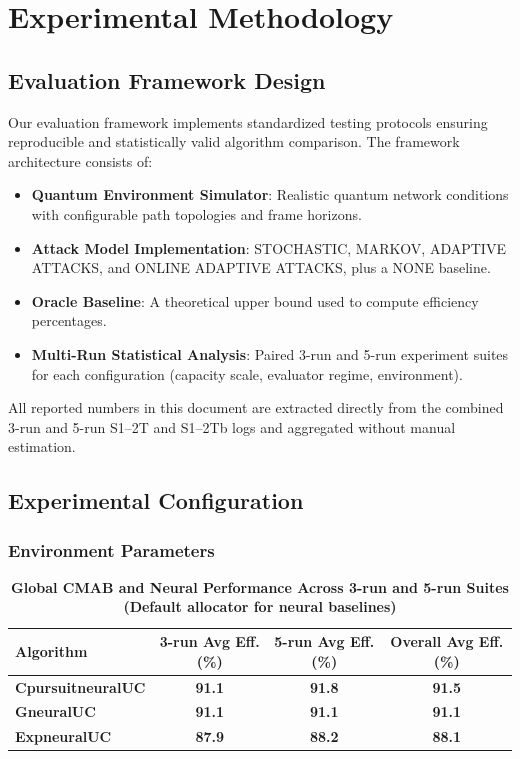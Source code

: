 \documentclass[12pt,a4paper]{article}
\newcommand{\performance}[1]{\textcolor{performancecolor}{\textbf{#1}}}
\newcommand{\neural}[1]{\textcolor{neuralcolor}{\textbf{#1}}}
\begin{document}
\newpage
\section{Experimental Methodology}

\subsection{Evaluation Framework Design}

Our evaluation framework implements standardized testing protocols ensuring reproducible and statistically valid algorithm comparison. The framework architecture consists of:

\begin{itemize}
\item \textbf{Quantum Environment Simulator}: Realistic quantum network conditions with configurable path topologies and frame horizons.
\item \textbf{Attack Model Implementation}: STOCHASTIC, MARKOV, ADAPTIVE ATTACKS, and ONLINE ADAPTIVE ATTACKS, plus a NONE baseline.
\item \textbf{Oracle Baseline}: A theoretical upper bound used to compute efficiency percentages.
\item \textbf{Multi-Run Statistical Analysis}: Paired 3-run and 5-run experiment suites for each configuration (capacity scale, evaluator regime, environment).
\end{itemize}

All reported numbers in this document are extracted directly from the combined 3-run and 5-run S1–2T and S1–2Tb logs and aggregated without manual estimation.

\subsection{Experimental Configuration}

\subsubsection{Environment Parameters}

\begin{table}[H]
\small
\centering
\caption{\performance{Global CMAB and Neural Performance Across 3-run and 5-run Suites (Default allocator for neural baselines)}}
\label{tab:global-performance}
\begin{tabular}{|l|c|c|c|}
\hline
\textbf{Algorithm} & \textbf{3-run Avg Eff. (\%)} & \textbf{5-run Avg Eff. (\%)} & \textbf{Overall Avg Eff. (\%)} \\
\hline\hline
\neural{CpursuitneuralUC} & \neural{91.1} & \neural{91.8} & \neural{\textbf{91.5}} \\
\neural{GneuralUC}        & \neural{91.1} & \neural{91.1} & \neural{\textbf{91.1}} \\
\neural{ExpneuralUC}      & \neural{87.9} & \neural{88.2} & \neural{\textbf{88.1}} \\
\hline
\end{tabular}
\end{table}
\end{document}
